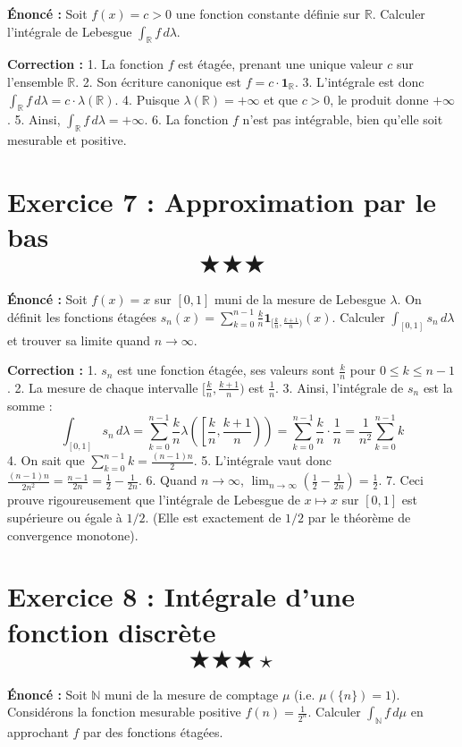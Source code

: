 \documentclass[11pt,a4paper]{article}
\begin{document}
\textbf{Énoncé :}
Soit $f(x) = c > 0$ une fonction constante définie sur $\mathbb{R}$.
Calculer l'intégrale de Lebesgue $\int_{\mathbb{R}} f \, d\lambda$.

\textbf{Correction :}
1. La fonction $f$ est étagée, prenant une unique valeur $c$ sur l'ensemble $\mathbb{R}$.
2. Son écriture canonique est $f = c \cdot \mathbf{1}_{\mathbb{R}}$.
3. L'intégrale est donc $\int_{\mathbb{R}} f \, d\lambda = c \cdot \lambda(\mathbb{R})$.
4. Puisque $\lambda(\mathbb{R}) = +\infty$ et que $c > 0$, le produit donne $+\infty$.
5. Ainsi, $\int_{\mathbb{R}} f \, d\lambda = +\infty$.
6. La fonction $f$ n'est pas intégrable, bien qu'elle soit mesurable et positive.


\section{Exercice 7 : Approximation par le bas \quad $$\bigstar\bigstar\bigstar$$}

\textbf{Énoncé :}
Soit $f(x) = x$ sur $[0, 1]$ muni de la mesure de Lebesgue $\lambda$.
On définit les fonctions étagées $s_n(x) = \sum_{k=0}^{n-1} \frac{k}{n} \mathbf{1}_{[\frac{k}{n}, \frac{k+1}{n})}(x)$.
Calculer $\int_{[0, 1]} s_n \, d\lambda$ et trouver sa limite quand $n \to \infty$.

\textbf{Correction :}
1. $s_n$ est une fonction étagée, ses valeurs sont $\frac{k}{n}$ pour $0 \le k \le n-1$.
2. La mesure de chaque intervalle $[\frac{k}{n}, \frac{k+1}{n})$ est $\frac{1}{n}$.
3. Ainsi, l'intégrale de $s_n$ est la somme :
   $$\int_{[0, 1]} s_n \, d\lambda = \sum_{k=0}^{n-1} \frac{k}{n} \lambda\left(\left[\frac{k}{n}, \frac{k+1}{n}\right)\right) = \sum_{k=0}^{n-1} \frac{k}{n} \cdot \frac{1}{n} = \frac{1}{n^2} \sum_{k=0}^{n-1} k$$
4. On sait que $\sum_{k=0}^{n-1} k = \frac{(n-1)n}{2}$.
5. L'intégrale vaut donc $\frac{(n-1)n}{2n^2} = \frac{n-1}{2n} = \frac{1}{2} - \frac{1}{2n}$.
6. Quand $n \to \infty$, $\lim_{n \to \infty} \left( \frac{1}{2} - \frac{1}{2n} \right) = \frac{1}{2}$.
7. Ceci prouve rigoureusement que l'intégrale de Lebesgue de $x \mapsto x$ sur $[0, 1]$ est supérieure ou égale à $1/2$. (Elle est exactement de $1/2$ par le théorème de convergence monotone).


\section{Exercice 8 : Intégrale d'une fonction discrète \quad $$\bigstar\bigstar\bigstar\star$$}

\textbf{Énoncé :}
Soit $\mathbb{N}$ muni de la mesure de comptage $\mu$ (i.e. $\mu(\{n\}) = 1$).
Considérons la fonction mesurable positive $f(n) = \frac{1}{2^n}$.
Calculer $\int_{\mathbb{N}} f \, d\mu$ en approchant $f$ par des fonctions étagées.
\end{document}
